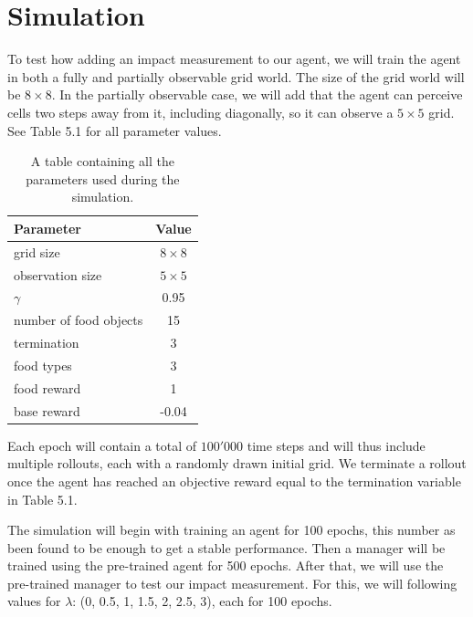 \documentclass[12pt,A4]{report}
\theoremstyle{definition}
\begin{document}


\section{Simulation}
To test how adding an impact measurement to our agent, we will train the agent in both a fully and partially observable grid world. The size of the grid world will be $8\times8$. In the partially observable case, we will add that the agent can perceive cells two steps away from it, including diagonally, so it can observe a $5\times5$ grid. See Table 5.1 for all parameter values.

\begin{table}[H]
  \centering
  \begin{tabular}{l | c}
    Parameter& Value \\ \hline
    grid size & $8 \times  8$ \\
    observation size & $5 \times  5$ \\
    $\gamma$ & 0.95 \\
    number of food objects & 15 \\
    termination & 3\\
    food types & 3 \\
    food reward & 1 \\
    base reward & -0.04 \\
  \end{tabular}
  \label{tab:sim_parms}
  \caption{A table containing all the parameters used during the simulation.}
\end{table}

Each epoch will contain a total of $100'000$ time steps and will thus include multiple rollouts, each with a randomly drawn initial grid. We terminate a rollout once the agent has reached an objective reward equal to the termination variable in Table 5.1. 

The simulation will begin with training an agent for 100 epochs, this number as been found to be enough to get a stable performance. Then a manager will be trained using the pre-trained agent for 500 epochs. After that, we will use the pre-trained manager to test our impact measurement. For this, we will following values for $\lambda$: (0, 0.5, 1, 1.5, 2, 2.5, 3), each for 100 epochs. 
\end{document}

